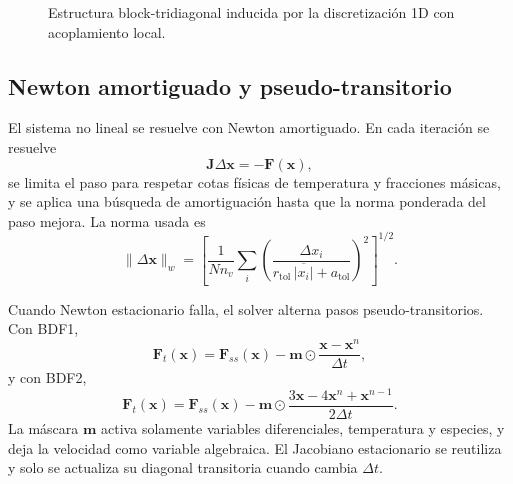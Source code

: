 \documentclass[12pt,a4paper]{article}
\begin{document}
\begin{figure}[H]
  \centering
  \caption{Estructura block-tridiagonal inducida por la discretización 1D con acoplamiento local.}
  \label{fig:blocktridiag}
\end{figure}

\subsection{Newton amortiguado y pseudo-transitorio}

El sistema no lineal se resuelve con Newton amortiguado. En cada iteración se resuelve
\begin{equation}
  \mathbf{J}\Delta\mathbf{x}=-\mathbf{F}(\mathbf{x}),
  \label{eq:newton}
\end{equation}
se limita el paso para respetar cotas físicas de temperatura y fracciones másicas, y se aplica una búsqueda de amortiguación hasta que la norma ponderada del paso mejora. La norma usada es
\begin{equation}
  \|\Delta\mathbf{x}\|_w
  =
  \left[
  \frac{1}{Nn_v}
  \sum_i
  \left(
  \frac{\Delta x_i}{r_\mathrm{tol}\,\overline{|x_i|}+a_\mathrm{tol}}
  \right)^2
  \right]^{1/2}.
  \label{eq:weightednorm}
\end{equation}

Cuando Newton estacionario falla, el solver alterna pasos pseudo-transitorios. Con BDF1,
\begin{equation}
  \mathbf{F}_t(\mathbf{x})
  =
  \mathbf{F}_{ss}(\mathbf{x})
  -
  \mathbf{m}\odot
  \frac{\mathbf{x}-\mathbf{x}^n}{\Delta t},
  \label{eq:bdf1}
\end{equation}
y con BDF2,
\begin{equation}
  \mathbf{F}_t(\mathbf{x})
  =
  \mathbf{F}_{ss}(\mathbf{x})
  -
  \mathbf{m}\odot
  \frac{3\mathbf{x}-4\mathbf{x}^n+\mathbf{x}^{n-1}}{2\Delta t}.
  \label{eq:bdf2}
\end{equation}
La máscara $\mathbf{m}$ activa solamente variables diferenciales, temperatura y especies, y deja la velocidad como variable algebraica. El Jacobiano estacionario se reutiliza y solo se actualiza su diagonal transitoria cuando cambia $\Delta t$.
\end{document}

